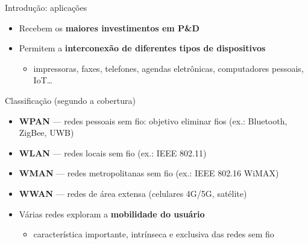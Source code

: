 \documentclass[aspectratio=169,11pt]{beamer}
\begin{document}
\begin{frame}{Introdução: aplicações}
  \begin{itemize}
    \item Recebem os \textbf{maiores investimentos em P\&D}
    \item Permitem a \textbf{interconexão de diferentes tipos de dispositivos}
      \begin{itemize}
        \item impressoras, faxes, telefones, agendas eletrônicas, computadores pessoais, IoT\ldots
      \end{itemize}
  \end{itemize}
  \begin{block}{Classificação (segundo a cobertura)}
    \begin{itemize}
      \item \textbf{WPAN} --- redes pessoais sem fio: objetivo eliminar fios (ex.: Bluetooth, ZigBee, UWB)
      \item \textbf{WLAN} --- redes locais sem fio (ex.: IEEE 802.11)
      \item \textbf{WMAN} --- redes metropolitanas sem fio (ex.: IEEE 802.16 WiMAX)
      \item \textbf{WWAN} --- redes de área extensa (celulares 4G/5G, satélite)
    \end{itemize}
  \end{block}
  \begin{itemize}
    \item Várias redes exploram a \textbf{mobilidade do usuário}
      \begin{itemize}
        \item característica importante, intrínseca e exclusiva das redes sem fio
      \end{itemize}
  \end{itemize}
\end{frame}
\end{document}
